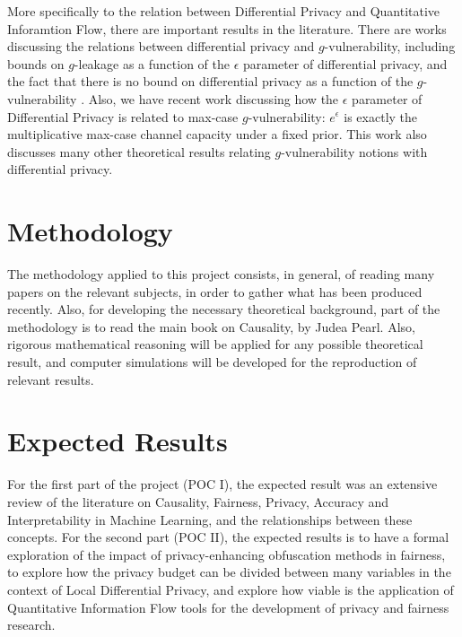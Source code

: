 \documentclass{article}
\begin{document}
More specifically to the relation between Differential Privacy and Quantitative Inforamtion Flow, there are important results in the literature. There are works discussing the relations between differential privacy and $g$-vulnerability, including bounds on $g$-leakage as a function of the $\epsilon$ parameter of differential privacy, and the fact that there is no bound on differential privacy as a function of the $g$-vulnerability \cite{alvim2015information}. Also, we have recent work \cite{fernandes2022explaining} discussing how the $\epsilon$ parameter of Differential Privacy is related to max-case $g$-vulnerability: $e^\epsilon$ is exactly the multiplicative max-case channel capacity under a fixed prior. This work also discusses many other theoretical results relating $g$-vulnerability notions with differential privacy. 

\section{Methodology}

The methodology applied to this project consists, in general, of reading many papers on the relevant subjects, in order to gather what has been produced recently. Also, for developing the necessary theoretical background, part of the methodology is to read the main book on Causality\cite{Causality}, by Judea Pearl. Also, rigorous mathematical reasoning will be applied for any possible theoretical result, and computer simulations will be developed for the reproduction of relevant results.

\section{Expected Results}

For the first part of the project (POC I), the expected result was an extensive review of the literature on Causality, Fairness, Privacy, Accuracy and Interpretability in Machine Learning, and the relationships between these concepts. For the second part (POC II), the expected results is to have a formal exploration of the impact of privacy-enhancing obfuscation methods in fairness, to explore how the privacy budget can be divided between many variables in the context of Local Differential Privacy, and explore how viable is the application of Quantitative Information Flow tools for the development of privacy and fairness research.
\end{document}
